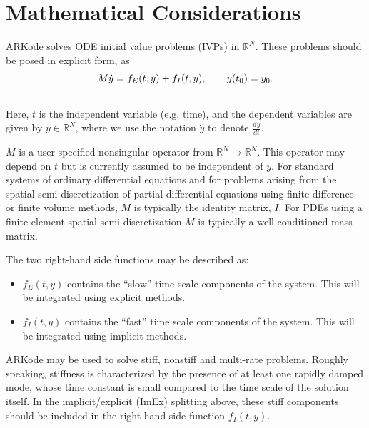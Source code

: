 \documentclass[letterpaper,10pt,english]{sphinxmanual}
\begin{document}
\chapter{Mathematical Considerations}
\label{Mathematics:mathematics}\label{Mathematics::doc}\label{Mathematics:mathematical-considerations}
ARKode solves ODE initial value problems (IVPs) in $\mathbb{R}^N$.
These problems should be posed in explicit form, as
\label{Mathematics:equation-IVP}\begin{gather}
\begin{split}M\dot{y} = f_E(t,y) + f_I(t,y), \qquad y(t_0) = y_0.\end{split}\label{Mathematics-IVP}\\\begin{split}\end{split}\notag
\end{gather}
Here, $t$ is the independent variable (e.g. time), and the
dependent variables are given by $y \in \mathbb{R}^N$, where we
use the notation $\dot{y}$ to denote $\frac{dy}{dt}$.

$M$ is a user-specified nonsingular operator from
$\mathbb{R}^N \to \mathbb{R}^N$.  This operator may depend on
$t$ but is currently assumed to be independent of $y$.
For standard systems of ordinary differential equations and for
problems arising from the spatial semi-discretization of partial
differential equations using finite difference or finite volume
methods, $M$ is typically the identity matrix, $I$.  For
PDEs using a finite-element spatial semi-discretization $M$ is
typically a well-conditioned mass matrix.

The two right-hand side functions may be described as:
\begin{itemize}
\item {} 
$f_E(t,y)$ contains the ``slow'' time scale components of the
system.  This will be integrated using explicit methods.

\item {} 
$f_I(t,y)$ contains the ``fast'' time scale components of the
system.  This will be integrated using implicit methods.

\end{itemize}

ARKode may be used to solve stiff, nonstiff and multi-rate problems.
Roughly speaking, stiffness is characterized by the presence of at
least one rapidly damped mode, whose time constant is small compared
to the time scale of the solution itself.  In the implicit/explicit
(ImEx) splitting above, these stiff components should be included in
the right-hand side function $f_I(t,y)$.
\end{document}

